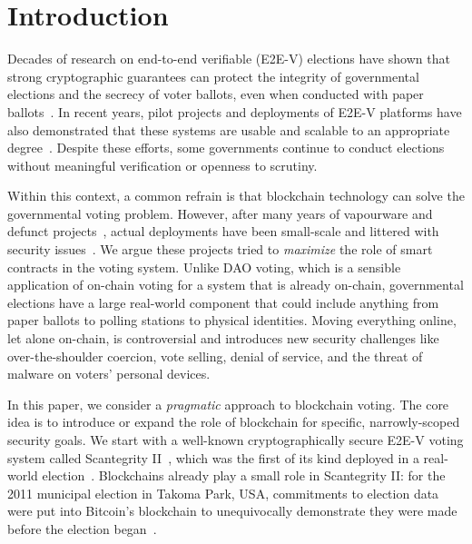 \section{Introduction}

Decades of research on end-to-end verifiable (E2E-V) elections have shown that strong cryptographic guarantees can protect the integrity of governmental elections and the secrecy of voter ballots, even when conducted with paper ballots~\cite{HR16}. 
In recent years, pilot projects and deployments of E2E-V platforms have also demonstrated that these systems are usable and scalable to an appropriate degree~\cite{AMPQ09,CCC+10,BBB+13,CRST15}. 
Despite these efforts, some governments continue to conduct elections without meaningful verification or openness to scrutiny.


Within this context, a common refrain is that blockchain technology can solve the governmental voting problem. However, after many years of vapourware and defunct projects~\cite{KSM21,Ern25}, actual deployments have been small-scale and littered with security issues~\cite{SKW20,GG20}. We argue these projects tried to \textit{maximize} the role of smart contracts in the voting system. Unlike DAO voting, which is a sensible application of on-chain voting for a system that is already on-chain, governmental elections have a large real-world component that could include anything from paper ballots to polling stations to physical identities. Moving everything online, let alone on-chain, is controversial and introduces new security challenges like over-the-shoulder coercion, vote selling, denial of service, and the threat of malware on voters' personal devices. 

In this paper, we consider a \textit{pragmatic} approach to blockchain voting. The core idea is to introduce or expand the role of blockchain for specific, narrowly-scoped security goals. We start with a well-known cryptographically secure E2E-V voting system called Scantegrity II~\cite{CCC+08}, which was the first of its kind deployed in a real-world election~\cite{CCC+10}. Blockchains already play a small role in Scantegrity II: for the 2011 municipal election in Takoma Park, USA, commitments to election data were put into Bitcoin's blockchain to unequivocally demonstrate they were made before the election began~\cite{CE12}.

